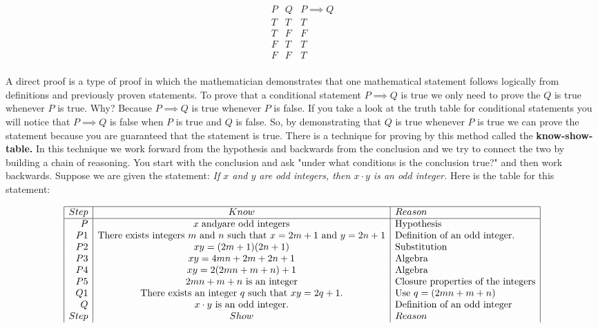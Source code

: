 \documentclass[10pt]{article}
\begin{document}
\begin{center}
    \[
\begin{array}{r|c|l} 
P & Q & P \implies Q\\
\hline
T & T & T\\
T & F & F\\
F & T & T\\
F & F & T\\
\end{array}
\]
\end{center}
A direct proof is a type of proof in which the mathematician demonstrates that one mathematical statement follows logically from definitions and previously proven statements. To prove that a conditional statement $P \implies Q$ is true we only need to prove the $Q$ is true whenever $P$ is true. Why? Because $P\implies Q$ is true whenever $P$ is false. If you take a look at the truth table for conditional statements you will notice that $P \implies Q$ is false when $P$ is true and $Q$ is false. So, by demonstrating that $Q$ is true whenever $P$ is true we can prove the statement because you are guaranteed that the statement is true. There is a technique for proving by this method called the \textbf{know-show-table.} In this technique we work forward from the hypothesis and backwards from the conclusion and we try to connect the two by building a chain of reasoning. You start with the conclusion and ask "under what conditions is the conclusion true?" and then work backwards. Suppose  we are given the statement: \textit{If $x$ and $y$ are odd integers, then $x \cdot y$ is an odd integer.} Here is the table for this statement:

\begin{center}
    \[
\begin{array}{|r|c|l|} \hline
Step & Know & Reason\\
\hline
P & x\hspace{.1cm} \text{and} y \text{are odd integers} & \text{Hypothesis}\\
P1 & \text{There exists integers $m$ and $n$ such that $x = 2m + 1$ and $y = 2n + 1$}  & \text{Definition of an odd integer.} \\
P2 & xy = (2m + 1)(2n + 1) & \text{Substitution}\\
P3 & xy = 4mn + 2m + 2n + 1 & \text{Algebra} \\
P4 & xy = 2(2mn + m + n) + 1 & \text{Algebra}\\
P5 & \text{$2mn + m + n$ is an integer} & \text{Closure properties of the integers}\\
Q1 & \text{There exists an integer $q$ such that $xy = 2q + 1.$}  & \text{Use $q = (2mn + m + n)$}\\
Q & \text{$ x \cdot y$ is an odd integer.} & \text{Definition of an odd integer}\\
Step & Show & Reason
\end{array}
\]
\end{center}
\end{document}
